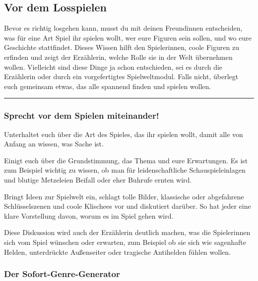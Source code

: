\documentclass[]{article}
\begin{document}
\subsection{Vor dem Losspielen}\label{vor-dem-losspielen}

Bevor es richtig losgehen kann, musst du mit deinen Freundinnen
entscheiden, was für eine Art Spiel ihr spielen wollt, wer eure Figuren
sein sollen, und wo eure Geschichte stattfindet. Dieses Wissen hilft den
Spielerinnen, coole Figuren zu erfinden und zeigt der Erzählerin, welche
Rolle sie in der Welt übernehmen wollen. Vielleicht sind diese Dinge ja
schon entschieden, sei es durch die Erzählerin oder durch ein
vorgefertigtes Spielweltmodul. Falls nicht, überlegt euch gemeinsam
etwas, das alle spannend finden und spielen wollen.

\begin{center}\rule{0.5\linewidth}{\linethickness}\end{center}

\columnsbegin

\subsubsection*{Sprecht vor dem Spielen
miteinander!}\label{sprecht-vor-dem-spielen-miteinander}

Unterhaltet euch über die Art des Spieles, das ihr spielen wollt, damit
alle von Anfang an wissen, was Sache ist.

Einigt euch über die Grundstimmung, das Thema und eure Erwartungen. Es
ist zum Beispiel wichtig zu wissen, ob man für leidenschaftliche
Schauspieleinlagen und blutige Metzeleien Beifall oder eher Buhrufe
ernten wird.

Bringt Ideen zur Spielwelt ein, schlagt tolle Bilder, klassische oder
abgefahrene Schlüsselszenen und coole Klischees vor und diskutiert
darüber. So hat jeder eine klare Vorstellung davon, worum es im Spiel
gehen wird.

Diese Diskussion wird auch der Erzählerin deutlich machen, was die
Spielerinnen sich vom Spiel wünschen oder erwarten, zum Beispiel ob sie
sich wie sagenhafte Helden, unterdrückte Außenseiter oder tragische
Antihelden fühlen wollen.

\subsubsection*{Der
Sofort-Genre-Generator}\label{der-sofort-genre-generator}
\end{document}
